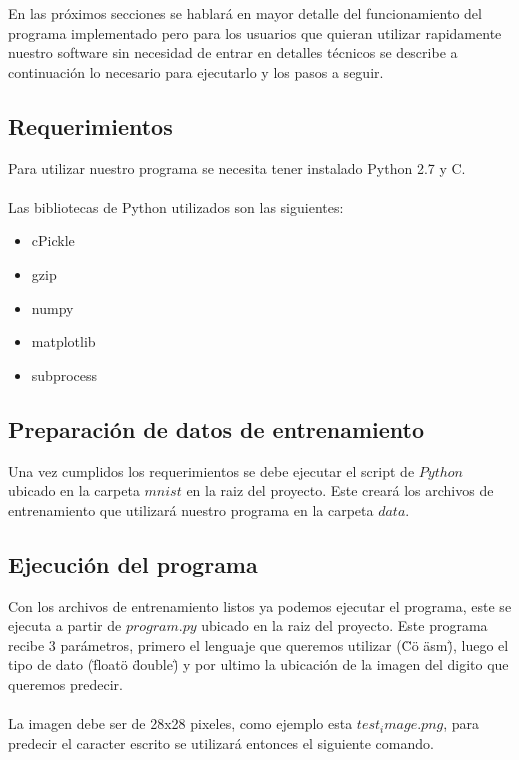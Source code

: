 
En las próximos secciones se hablará en mayor detalle del funcionamiento del programa implementado pero para los usuarios que quieran utilizar rapidamente nuestro software sin necesidad de entrar en detalles técnicos se describe a continuación lo necesario para ejecutarlo y los pasos a seguir.

\subsection{Requerimientos}

Para utilizar nuestro programa se necesita tener instalado Python 2.7 y C.
\\
\\
Las bibliotecas de Python utilizados son las siguientes:

\begin{itemize}

\item cPickle
\item gzip
\item numpy
\item matplotlib
\item subprocess

\end{itemize}

\subsection{Preparación de datos de entrenamiento}

Una vez cumplidos los requerimientos se debe ejecutar el script de $Python$ ubicado en la carpeta $mnist$ en la raiz del proyecto. Este creará los archivos de entrenamiento que utilizará nuestro programa en la carpeta $data$.

\subsection{Ejecución del programa}

Con los archivos de entrenamiento listos ya podemos ejecutar el programa, este se ejecuta a partir de $program.py$ ubicado en la raiz del proyecto. Este programa recibe 3 parámetros, primero el lenguaje que queremos utilizar (\"C\" o \"asm\"), luego el tipo de dato (\"float\" o \"double\") y por ultimo la ubicación de la imagen del digito que queremos predecir.
\\
\\
La imagen debe ser de 28x28 pixeles, como ejemplo esta $test_image.png$, para predecir el caracter escrito se utilizará entonces el siguiente comando.

